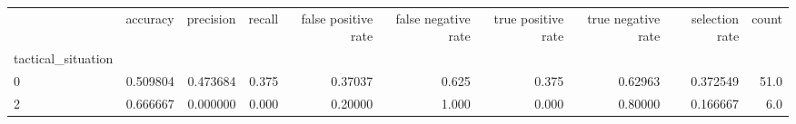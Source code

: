 \begin{tabular}{lrrrrrrrrr}
\toprule
{} &  accuracy &  precision &  recall &  false positive rate &  false negative rate &  true positive rate &  true negative rate &  selection rate &  count \\
tactical\_situation &           &            &         &                      &                      &                     &                     &                 &        \\
\midrule
0                  &  0.509804 &   0.473684 &   0.375 &              0.37037 &                0.625 &               0.375 &             0.62963 &        0.372549 &   51.0 \\
2                  &  0.666667 &   0.000000 &   0.000 &              0.20000 &                1.000 &               0.000 &             0.80000 &        0.166667 &    6.0 \\
\bottomrule
\end{tabular}
